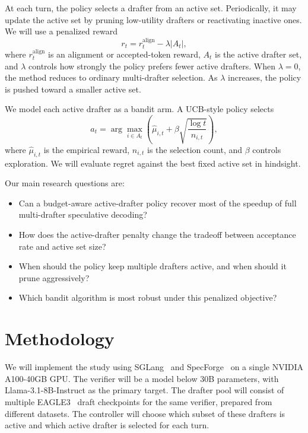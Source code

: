 \documentclass[11pt]{article}
\begin{document}
At each turn, the policy selects a drafter from an active set. Periodically, it may update the active set by pruning low-utility drafters or reactivating inactive ones. We will use a penalized reward
\begin{equation}
    r_t = r^{\mathrm{align}}_t - \lambda |A_t|,
\end{equation}
where $r^{\mathrm{align}}_t$ is an alignment or accepted-token reward, $A_t$ is the active drafter set, and $\lambda$ controls how strongly the policy prefers fewer active drafters. When $\lambda=0$, the method reduces to ordinary multi-drafter selection. As $\lambda$ increases, the policy is pushed toward a smaller active set.

We model each active drafter as a bandit arm. A UCB-style policy selects
\begin{equation}
    a_t = \arg\max_{i \in A_t}
    \left(\hat{\mu}_{i,t} + \beta \sqrt{\frac{\log t}{n_{i,t}}}\right),
\end{equation}
where $\hat{\mu}_{i,t}$ is the empirical reward, $n_{i,t}$ is the selection count, and $\beta$ controls exploration. We will evaluate regret against the best fixed active set in hindsight.

Our main research questions are:
\begin{itemize}
    \item Can a budget-aware active-drafter policy recover most of the speedup of full multi-drafter speculative decoding?
    \item How does the active-drafter penalty change the tradeoff between acceptance rate and active set size?
    \item When should the policy keep multiple drafters active, and when should it prune aggressively?
    \item Which bandit algorithm is most robust under this penalized objective?
\end{itemize}

\section{Methodology}

We will implement the study using SGLang~\cite{sglang} and SpecForge~\cite{specforge} on a single NVIDIA A100-40GB GPU. The verifier will be a model below 30B parameters, with Llama-3.1-8B-Instruct as the primary target. The drafter pool will consist of multiple EAGLE3~\cite{eagle3} draft checkpoints for the same verifier, prepared from different datasets. The controller will choose which subset of these drafters is active and which active drafter is selected for each turn.
\end{document}
